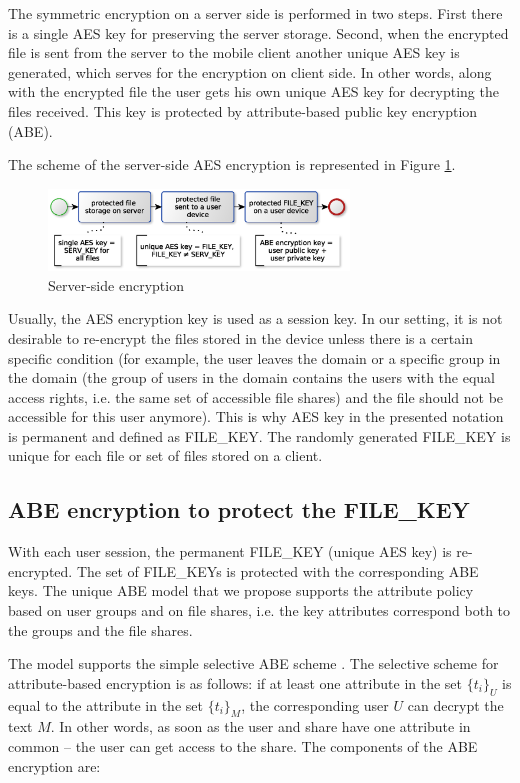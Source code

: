 \documentclass[twocolumn]{svjour3}          	%
\begin{document}
The symmetric encryption on a server side is performed in two steps. First there is a single AES key for preserving the server storage. Second, when the encrypted file is sent from the server to the mobile client another unique AES key is generated, which serves for the encryption on client side. In other words, along with the encrypted file the user gets his own unique AES key for decrypting the files received. This key is protected by attribute-based public key encryption (ABE). 

The scheme of the server-side AES encryption is represented in Figure \ref{fig:11}.

\begin{figure}[h!]
	\centering
	\includegraphics[width=8cm]{figures/server-sideencryption.eps}
	\caption{Server-side encryption}
	\label{fig:11}
\end{figure}

Usually, the AES encryption key is used as a session key. In our setting, it is not desirable to re-encrypt the files stored in the device unless there is a certain specific condition (for example, the user leaves the domain or a specific group in the domain (the group of users in the domain contains the users with the equal access rights, i.e. the same set of accessible file shares) and the file should not be accessible for this user anymore). This is why AES key in the presented notation is permanent and defined as FILE\_KEY. The randomly generated FILE\_KEY is unique for each file or set of files stored on a client. 

\subsection{ABE encryption to protect the FILE\_KEY }
\label{sec_abe}
With each user session, the permanent FILE\_KEY (uni\-que AES key) is re-encrypted. The set of FILE\_KEYs is protected with the corresponding ABE keys. The unique ABE model that we propose supports the attribute policy based on user groups and on file shares, i.e. the key attributes correspond both to the groups and the file shares. 

The model supports the simple selective ABE scheme \cite{galibus2015cloud,galibus2014}. The selective scheme for attribute-based encryption is as follows: if at least one attribute in the set $\{t_i\}_U$ is equal to the attribute in the set $\{t_i\}_M$, the corresponding user $U$ can decrypt the text $M$. In other words, as soon as the user and share have one attribute in common – the user can get access to the share. The components of the ABE encryption are:
\end{document}
